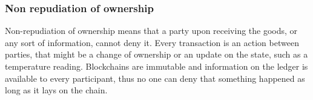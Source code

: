 \subsubsection{Non repudiation of ownership}
Non-repudiation of ownership means that a party upon receiving the goods, or any sort of information, cannot deny it. Every transaction is an action between parties, that might be a change of ownership or an update on the state, such as a temperature reading. Blockchains are immutable and information on the ledger is available to every participant, thus no one can deny that something happened as long as it lays on the chain.